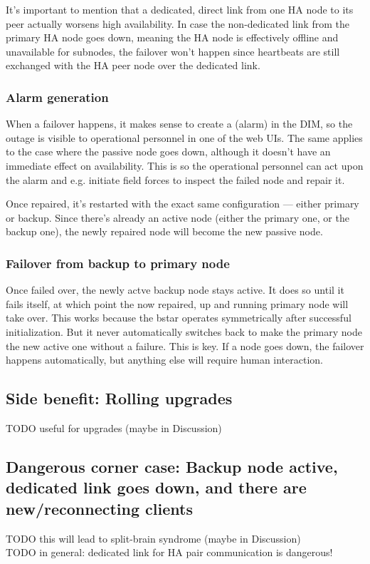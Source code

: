 It's important to mention that a dedicated, direct link from one HA node to its
peer actually worsens high availability. In case the non-dedicated link from
the primary HA node goes down, meaning the HA node is effectively offline and
unavailable for subnodes, the failover won't happen since heartbeats are still
exchanged with the HA peer node over the dedicated link.

\subsubsection{Alarm generation}
When a failover happens, it makes sense to create a  (alarm) in the
DIM, so the outage is visible to operational personnel in one of the web UIs.
The same applies to the case where the passive node goes down, although it
doesn't have an immediate effect on availability.  This is so the operational
personnel can act upon the alarm and e.g. initiate field forces to inspect the
failed node and repair it.

Once repaired, it's restarted with the exact same configuration --- either primary
or backup. Since there's already an active node (either the primary one,
or the backup one), the newly repaired node will become the new passive node.

\subsubsection{Failover from backup to primary node}
Once failed over, the newly actve backup node stays active. It does so until it
fails itself, at which point the now repaired, up and running primary node will
take over. This works because the \gls{bstar} operates symmetrically
after successful initialization. But it never automatically switches back to
make the primary node the new active one without a failure. This is key. If a
node goes down, the failover happens automatically, but anything else will
require human interaction.

\subsection{Side benefit: Rolling upgrades}
TODO useful for upgrades (maybe in Discussion)\\

\subsection{Dangerous corner case: Backup node active, dedicated link goes down, and there are new/reconnecting clients}
TODO this will lead to split-brain syndrome (maybe in Discussion)\\
TODO in general: dedicated link for HA pair communication is dangerous!\\

